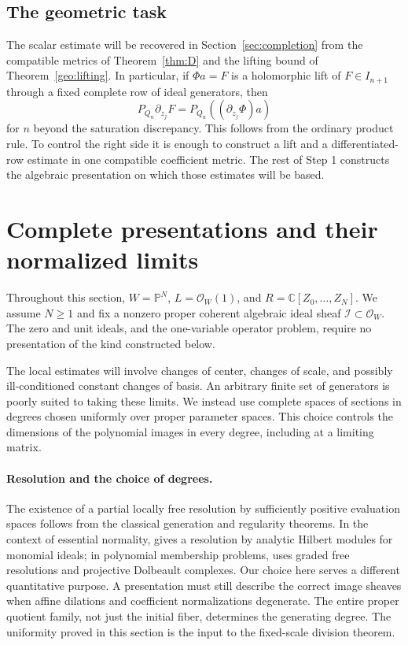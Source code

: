 \documentclass[11pt,reqno]{amsart}
\numberwithin{equation}{section}
\theoremstyle{definition}
\theoremstyle{remark}
\begin{document}
\subsection{The geometric task}
The scalar estimate will be recovered in Section~\ref{sec:completion}
from the compatible metrics of Theorem~\ref{thm:D} and the lifting bound
of Theorem~\ref{geo:lifting}. In particular, if $\Phi a=F$ is a
holomorphic lift of $F\in I_{n+1}$ through a fixed complete row of ideal
generators, then
\[
 P_{Q_n}\partial_{z_j}F=P_{Q_n}((\partial_{z_j}\Phi)a)
\]
for $n$ beyond the saturation discrepancy. This follows from the ordinary
product rule. To control the right side it is enough to construct a
lift and a differentiated-row estimate in one compatible coefficient
metric. The rest of Step 1 constructs the algebraic presentation on which
those estimates will be based.



\section{Complete presentations and their normalized limits}
\label{sec:algebra}

Throughout this section, \(W=\mathbb P^N\), \(L=\mathcal O_W(1)\), and
\(R=\mathbb C[Z_0,\ldots,Z_N]\). We assume \(N\geq1\) and fix a nonzero
proper coherent algebraic ideal sheaf \(\mathscr I\subset\mathcal O_W\).
The zero and unit ideals, and the one-variable operator problem, require no
presentation of the kind constructed below.

The local estimates will involve changes of center, changes of scale, and
possibly ill-conditioned constant changes of basis. An arbitrary
finite set of generators is poorly suited to taking these limits. We
instead use complete spaces of sections in degrees chosen uniformly over
proper parameter spaces. This choice controls the dimensions of the
polynomial images in every degree, including at a limiting matrix.

\paragraph{Resolution and the choice of degrees.}
The existence of a partial locally free resolution by sufficiently
positive evaluation spaces follows from the classical generation
and regularity theorems. In the context of essential normality,
\cite{DouglasJabbariTangYu} gives a resolution by analytic Hilbert
modules for monomial ideals; in polynomial membership problems,
\cite{AnderssonWulcan} uses graded free resolutions and projective
Dolbeault complexes. Our choice here serves a different quantitative
purpose. A presentation must still describe the correct image sheaves
when affine dilations and coefficient normalizations degenerate. The
entire proper quotient family, not just the initial fiber, determines
the generating degree. The uniformity proved in this section is the
input to the fixed-scale division theorem.
\end{document}
